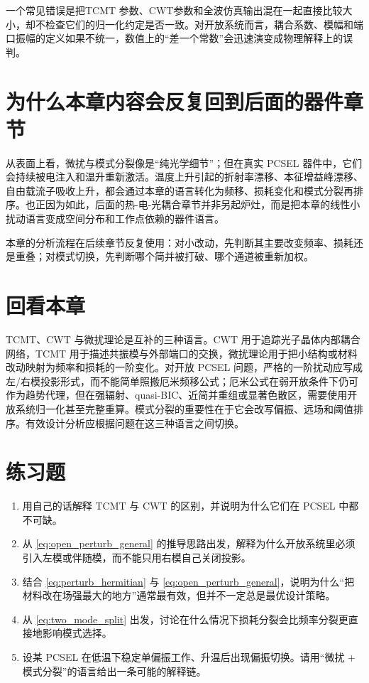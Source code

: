 一个常见错误是把TCMT 参数、CWT参数和全波仿真输出混在一起直接比较大小，却不检查它们的归一化约定是否一致。对开放系统而言，耦合系数、模幅和端口振幅的定义如果不统一，数值上的“差一个常数”会迅速演变成物理解释上的误判。

\section{为什么本章内容会反复回到后面的器件章节}
从表面上看，微扰与模式分裂像是“纯光学细节”；但在真实 PCSEL 器件中，它们会持续被电注入和温升重新激活。温度上升引起的折射率漂移、本征增益峰漂移、自由载流子吸收上升，都会通过本章的语言转化为频移、损耗变化和模式分裂再排序。也正因为如此，后面的热-电-光耦合章节并非另起炉灶，而是把本章的线性小扰动语言变成空间分布和工作点依赖的器件语言。

本章的分析流程在后续章节反复使用：对小改动，先判断其主要改变频率、损耗还是重叠；对模式切换，先判断哪个简并被打破、哪个通道被重新加权。

\section*{回看本章}
TCMT、CWT 与微扰理论是互补的三种语言。CWT 用于追踪光子晶体内部耦合网络，TCMT 用于描述共振模与外部端口的交换，微扰理论用于把小结构或材料改动映射为频率和损耗的一阶变化。对开放 PCSEL 问题，严格的一阶扰动应写成左/右模投影形式，而不能简单照搬厄米频移公式；厄米公式在弱开放条件下仍可作为趋势代理，但在强辐射、quasi-BIC、近简并重组或显著色散区，需要使用开放系统归一化甚至完整重算。模式分裂的重要性在于它会改写偏振、远场和阈值排序。有效设计分析应根据问题在这三种语言之间切换。

\section*{练习题}
\begin{enumerate}
  \item \basicq 用自己的话解释 TCMT 与 CWT 的区别，并说明为什么它们在 PCSEL 中都不可缺。

  \item \basicq 从 \cref{eq:open_perturb_general} 的推导思路出发，解释为什么开放系统里必须引入左模或伴随模，而不能只用右模自己关闭投影。

  \item \midq 结合 \cref{eq:perturb_hermitian} 与 \cref{eq:open_perturb_general}，说明为什么“把材料改在场强最大的地方”通常最有效，但并不一定总是最优设计策略。

  \item \midq 从 \cref{eq:two_mode_split} 出发，讨论在什么情况下损耗分裂会比频率分裂更直接地影响模式选择。

  \item \hardq 设某 PCSEL 在低温下稳定单偏振工作、升温后出现偏振切换。请用“微扰 + 模式分裂”的语言给出一条可能的解释链。
\end{enumerate}

